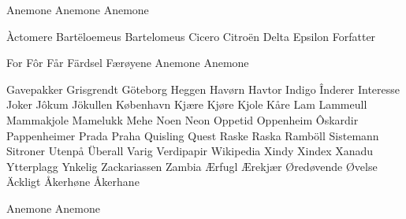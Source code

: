 \documentclass[norsk]{scrartcl}
\begin{document}
Anemone
Anemone
Anemone

Àctomere
Bartëloemeus
Bartelomeus
Cicero
Citroën
Delta
Epsilon
Forfatter

For
Fôr
Får
Färdsel
Færøyene
Anemone
Anemone

Gavepakker
Grisgrendt
Göteborg
Heggen
Havørn
Havtor
Indigo
Înderer
Interesse
Joker
Jôkum
Jökullen
København
Kjære
Kjøre
Kjole
Kåre
Lam
Lammeull
Mammakjole
Mamelukk
Mehe
Noen
Neon
Oppetid
Oppenheim
Ôskardir
Pappenheimer
Prada
Praha
Quisling
Quest
Raske
Raska
Ramböll
Sistemann
Sitroner
Utenpå
Überall
Varig
Verdipapir
Wikipedia
Xindy
Xindex
Xanadu
Ytterplagg
Ynkelig
Zackariassen
Zambia
Ærfugl
Ærekjær
Øredøvende
Øvelse
Äckligt
Åkerhøne
Åkerhane

\newpage
Anemone
Anemone
\end{document}
